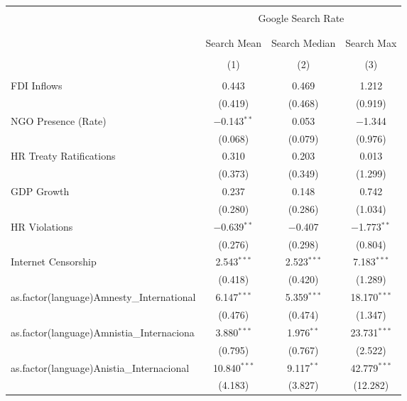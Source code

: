 
\begin{table}[!htbp] \centering 
  \caption{} 
  \label{} 
\begin{tabular}{@{\extracolsep{5pt}}lccc} 
\\[-1.8ex]\hline 
\hline \\[-1.8ex] 
 & \multicolumn{3}{c}{Google Search Rate} \\ 
\cline{2-4} 
\\[-1.8ex] & \multicolumn{3}{c}{ } \\ 
 & Search Mean & Search Median & Search Max \\ 
\\[-1.8ex] & (1) & (2) & (3)\\ 
\hline \\[-1.8ex] 
 FDI Inflows & 0.443 & 0.469 & 1.212 \\ 
  & (0.419) & (0.468) & (0.919) \\ 
  NGO Presence (Rate) & $-$0.143$^{**}$ & 0.053 & $-$1.344 \\ 
  & (0.068) & (0.079) & (0.976) \\ 
  HR Treaty Ratifications & 0.310 & 0.203 & 0.013 \\ 
  & (0.373) & (0.349) & (1.299) \\ 
  GDP Growth & 0.237 & 0.148 & 0.742 \\ 
  & (0.280) & (0.286) & (1.034) \\ 
  HR Violations & $-$0.639$^{**}$ & $-$0.407 & $-$1.773$^{**}$ \\ 
  & (0.276) & (0.298) & (0.804) \\ 
  Internet Censorship & 2.543$^{***}$ & 2.523$^{***}$ & 7.183$^{***}$ \\ 
  & (0.418) & (0.420) & (1.289) \\ 
  as.factor(language)Amnesty\_International & 6.147$^{***}$ & 5.359$^{***}$ & 18.170$^{***}$ \\ 
  & (0.476) & (0.474) & (1.347) \\ 
  as.factor(language)Amnistia\_Internaciona & 3.880$^{***}$ & 1.976$^{**}$ & 23.731$^{***}$ \\ 
  & (0.795) & (0.767) & (2.522) \\ 
  as.factor(language)Anistia\_Internacional & 10.840$^{***}$ & 9.117$^{**}$ & 42.779$^{***}$ \\ 
  & (4.183) & (3.827) & (12.282) \\ 

\end{tabular}
\end{table}
